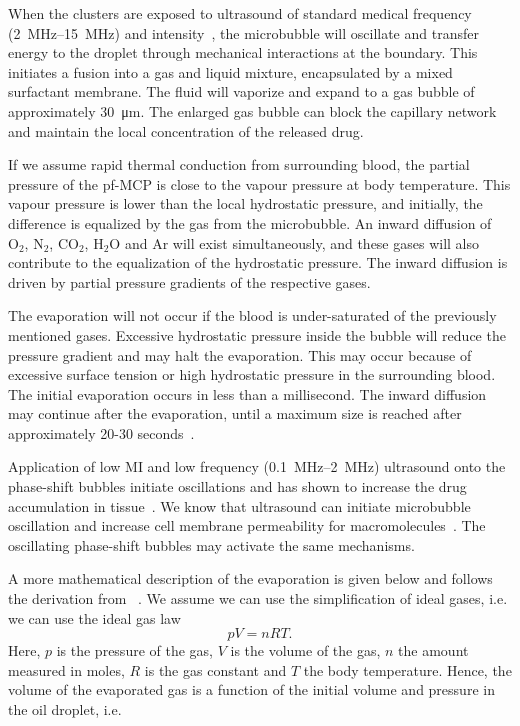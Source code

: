 When the clusters are exposed to ultrasound of standard medical frequency (\SIrange{2}{15}{\mega\hertz}) and intensity~\cite{Hoskins2010}, the microbubble will oscillate and transfer energy to the droplet through mechanical interactions at the boundary. This initiates a fusion into a gas and liquid mixture, encapsulated by a mixed surfactant membrane. The fluid will vaporize and expand to a gas bubble of approximately \SI{30}{\micro\metre}. The enlarged gas bubble can block the capillary network and maintain the local concentration of the released drug.  

If we assume rapid thermal conduction from surrounding blood, the partial pressure of the pf-MCP is close to the vapour pressure at body temperature. This vapour pressure is lower than the local hydrostatic pressure, and initially, the difference is equalized by the gas from the microbubble. An inward diffusion of $\mathrm{O}_2$, $\mathrm{N}_2$, $\mathrm{CO}_2$, $\mathrm{H}_2\mathrm{O}$ and $\mathrm{Ar}$ will exist simultaneously, and these gases will also contribute to the equalization of the hydrostatic pressure. The inward diffusion is driven by partial pressure gradients of the respective gases. 

The evaporation will not occur if the blood is under-saturated of the previously mentioned gases. Excessive hydrostatic pressure inside the bubble will reduce the pressure gradient and may halt the evaporation. This may occur because of excessive surface tension or high hydrostatic pressure in the surrounding blood. The initial evaporation occurs in less than a millisecond. The inward diffusion may continue after the evaporation, until a maximum size is reached after approximately 20-30 seconds~\cite{Healey_pc}.


Application of low MI and low frequency (\SIrange{0.1}{2}{\mega\hertz}) ultrasound onto the phase-shift bubbles initiate oscillations and has shown to increase the drug accumulation in tissue~\cite{wamel2014}. We know that ultrasound can initiate microbubble oscillation and increase cell membrane permeability for macromolecules~\cite{VanWamel2006a}. The oscillating phase-shift bubbles may activate the same mechanisms.

A more mathematical description of the evaporation is given below and follows the derivation from ~\citet{Healey2013}. We assume we can use the simplification of  ideal gases, i.e. we can use the ideal gas law
\begin{equation}
\label{ideal gas law}
 pV = nRT. 
\end{equation}  
Here, $p$ is the pressure of the gas, $V$ is the volume of the gas, $n$ the amount measured in moles, $R$ is the gas constant and $T$ the  body temperature. Hence, the volume of the evaporated gas is a function of the initial volume and pressure in the oil droplet, i.e.

